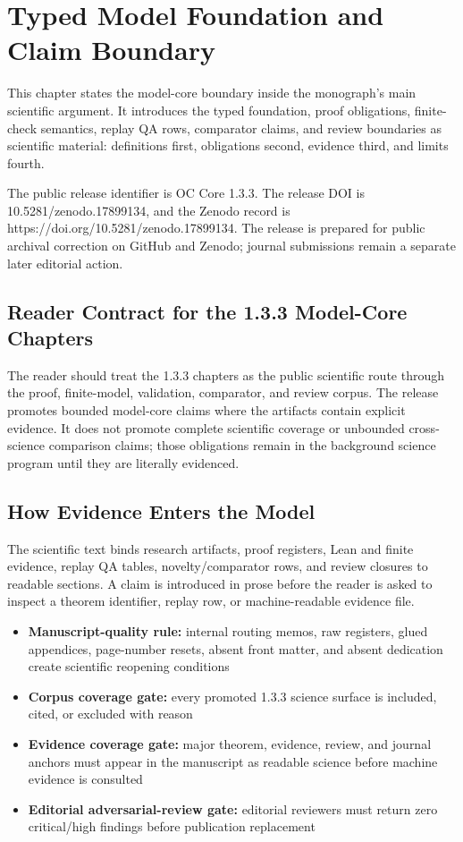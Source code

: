 \section{Typed Model Foundation and Claim Boundary}
\label{sec:oc133-integrated-scientific-closure}
This chapter states the model-core boundary inside the monograph's main scientific argument. It introduces the typed foundation, proof obligations, finite-check semantics, replay QA rows, comparator claims, and review boundaries as scientific material: definitions first, obligations second, evidence third, and limits fourth.

The public release identifier is OC Core 1.3.3. The release DOI is 10.5281/zenodo.17899134, and the Zenodo record is https://doi.org/10.5281/zenodo.17899134. The release is prepared for public archival correction on GitHub and Zenodo; journal submissions remain a separate later editorial action.

\subsection{Reader Contract for the 1.3.3 Model-Core Chapters}
The reader should treat the 1.3.3 chapters as the public scientific route through the proof, finite-model, validation, comparator, and review corpus. The release promotes bounded model-core claims where the artifacts contain explicit evidence. It does not promote complete scientific coverage or unbounded cross-science comparison claims; those obligations remain in the background science program until they are literally evidenced.

\subsection{How Evidence Enters the Model}
The scientific text binds research artifacts, proof registers, Lean and finite evidence, replay QA tables, novelty/comparator rows, and review closures to readable sections. A claim is introduced in prose before the reader is asked to inspect a theorem identifier, replay row, or machine-readable evidence file.

\begin{itemize}[leftmargin=1.8em]
\item \textbf{Manuscript-quality rule:} internal routing memos, raw registers, glued appendices, page-number resets, absent front matter, and absent dedication create scientific reopening conditions
\item \textbf{Corpus coverage gate:} every promoted 1.3.3 science surface is included, cited, or excluded with reason
\item \textbf{Evidence coverage gate:} major theorem, evidence, review, and journal anchors must appear in the manuscript as readable science before machine evidence is consulted
\item \textbf{Editorial adversarial-review gate:} editorial reviewers must return zero critical/high findings before publication replacement
\end{itemize}
